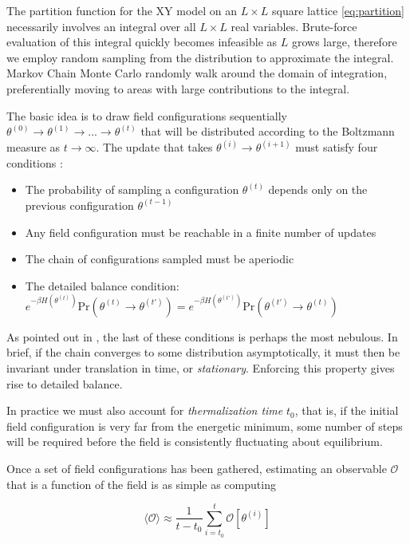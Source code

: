 \documentclass[12pt]{article}
\begin{document}
The partition function for the XY model on an $L\times L$ square lattice \ref{eq:partition} necessarily involves an integral over all $L\times L$ real variables.
Brute-force evaluation of this integral quickly becomes infeasible as $L$ grows large, therefore we employ random sampling from the distribution to approximate
the integral. Markov Chain Monte Carlo randomly walk around the domain of integration, preferentially moving to areas with large contributions to the integral.

The basic idea is to draw field configurations sequentially $\theta^{(0)} \rightarrow \theta^{(1)} \rightarrow ... \rightarrow \theta^{(t)}$ that will be
distributed according to the Boltzmann measure as $t\rightarrow\infty$. The update that takes $\theta^{(i)}\rightarrow\theta^{(i+1)}$ must satisfy four conditions \cite{hanada2018markovchainmontecarlo}:

\begin{itemize}
	\item The probability of sampling a configuration $\theta^{(t)}$ depends only on the previous configuration $\theta^{(t-1)}$
	\item Any field configuration must be reachable in a finite number of updates
	\item The chain of configurations sampled must be aperiodic
	\item The detailed balance condition: $e^{-\beta H(\theta^{(t)})}\text{Pr}(\theta^{(t)}\rightarrow\theta^{(t')})=e^{-\beta H(\theta^{(t')})}\text{Pr}(\theta^{(t')}\rightarrow\theta^{(t)})$
\end{itemize}

As pointed out in \cite{hanada2018markovchainmontecarlo}, the last of these conditions is perhaps the most nebulous. In brief, if the chain converges to some
distribution asymptotically, it must then be invariant under translation in time, or \textit{stationary}. Enforcing this property gives rise to detailed balance.

In practice we must also account for \textit{thermalization time} $t_0$, that is, if the initial field configuration is very far from the energetic minimum, some number of steps
will be required before the field is consistently fluctuating about equilibrium.

Once a set of field configurations has been gathered, estimating an observable $\mathcal{O}$ that is a function of the field is as simple as computing

\begin{equation}
	\langle \mathcal{O} \rangle \approx \frac{1}{t-t_0} \sum_{i=t_0}^{t} \mathcal{O}[\theta^{(i)}]
\end{equation}
\end{document}
